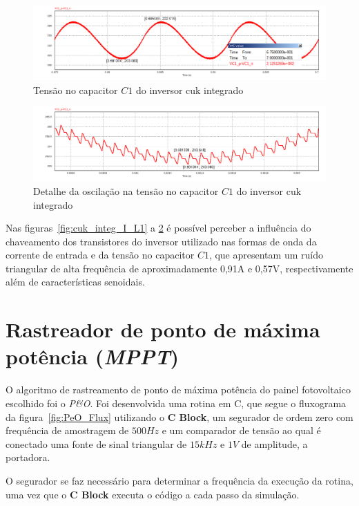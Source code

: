 \documentclass[
	12pt,				%
	openany,
	onseside,
	a4paper,			%
	english,			%
	french,				%
	spanish,			%
	brazil,				%
	]{abntex2}
\begin{document}
\begin{figure}[H]%
	\centering
		\includegraphics[width= \linewidth]{cuk_integ_VC1}
		\caption{Tensão no capacitor $C1$ do inversor cuk integrado}
		\label{fig:cuk_integ_V_C1}
\end{figure}

\begin{figure}[H]%
	\centering
		\includegraphics[width= \linewidth]{cuk_integ_ripp_VC1}
		\caption{Detalhe da oscilação na tensão no capacitor $C1$ do inversor cuk integrado}
		\label{fig:cuk_integ_ripp_V_C1}
\end{figure}

Nas figuras~\ref{fig:cuk_integ_I_L1} a \ref{fig:cuk_integ_ripp_V_C1} é possível perceber a influência do chaveamento dos transistores do inversor utilizado nas formas de onda da corrente de entrada e da tensão no capacitor $C1$, que apresentam um ruído triangular de alta frequência de aproximadamente 0,91A e 0,57V, respectivamente além de características senoidais.


\section{Rastreador de ponto de máxima potência (\textit{MPPT})}\label{sec:met_mppt}

O algoritmo de rastreamento de ponto de máxima potência do painel fotovoltaico escolhido foi o \textit{P\&O}. Foi desenvolvida uma rotina em C, que segue o fluxograma da figura~\ref{fig:PeO_Flux} utilizando o \textbf{C Block}, um segurador de ordem zero com frequência de amostragem de $500Hz$ e um comparador de tensão ao qual é conectado uma fonte de sinal triangular de $15kHz$ e $1V$ de amplitude, a portadora.

O segurador se faz necessário para determinar a frequência da execução da rotina, uma vez que o \textbf{C Block} executa o código a cada passo da simulação.
\end{document}
